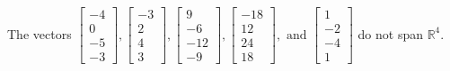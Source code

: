 \begin{exercise}
\begin{exerciseStatement}
  \end{exerciseStatement}
  \begin{exerciseAnswer}
   The vectors \(\left[\begin{array}{r}
-4 \\
0 \\
-5 \\
-3
\end{array}\right] , \left[\begin{array}{r}
-3 \\
2 \\
4 \\
3
\end{array}\right] , \left[\begin{array}{r}
9 \\
-6 \\
-12 \\
-9
\end{array}\right] , \left[\begin{array}{r}
-18 \\
12 \\
24 \\
18
\end{array}\right] , \text{ and } \left[\begin{array}{r}
1 \\
-2 \\
-4 \\
1
\end{array}\right]\) 
  	 do not  
	span \(\mathbb{R}^4\).
  


  \end{exerciseAnswer}
\end{exercise}